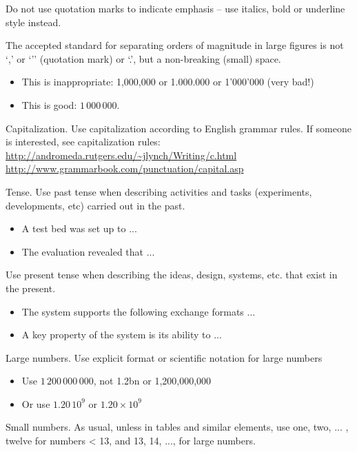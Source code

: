 \documentclass[10pt]{report}
\begin{document}
Do not use quotation marks to indicate emphasis – use italics, bold or
underline style instead.

The accepted standard for separating orders of magnitude in large
figures is not ‘,’ or ‘’’ (quotation mark) or ‘.’, but a non-breaking
(small) space.

\begin{itemize}
\item   This is inappropriate: 1,000,000 or 1.000.000 or 1’000’000
  (very bad!) 
\item  This is good: $1\,000\,000$. 
\end{itemize}

Capitalization. Use capitalization according to English grammar rules. If someone is interested, see 
capitalization rules:\\
\url{http://andromeda.rutgers.edu/~jlynch/Writing/c.html}\\
\url{http://www.grammarbook.com/punctuation/capital.asp}

Tense. Use past tense when describing activities and tasks (experiments, developments, etc) carried out in the past. 

\begin{itemize}
\item  A test bed was set up to ...
\item  The evaluation revealed that ...
\end{itemize}

Use present tense when describing the ideas, design, systems, etc. that exist in the present. 

\begin{itemize}
\item The system supports the following exchange formats ...
\item  A key property of the system is its ability to ...
\end{itemize}

Large numbers. Use explicit format or scientific notation for large numbers

\begin{itemize}
\item Use $1\,200\,000\,000$, not 1.2bn or 1,200,000,000
\item Or use $1.20\,10^9$ or $1.20 \times 10^9$
\end{itemize}

Small numbers. As usual, unless in tables and similar elements,
use {one, two, ... , twelve} for numbers < 13, and {13, 14, ..., }
for large numbers.
\end{document}
